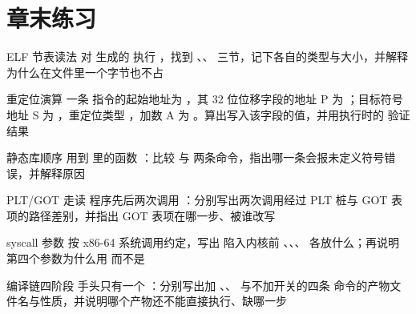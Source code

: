 \section*{章末练习}

\begin{chapterexercise}{ELF 节表读法}
对  生成的  执行 ，找到 、、 三节，记下各自的类型与大小，并解释  为什么在文件里一个字节也不占
\end{chapterexercise}

\begin{chapterexercise}{重定位演算}
一条  指令的起始地址为 ，其 32 位位移字段的地址 P 为 ；目标符号地址 S 为 ，重定位类型 ，加数 A 为 。算出写入该字段的值，并用执行时的  验证结果
\end{chapterexercise}

\begin{chapterexercise}{静态库顺序}
 用到  里的函数 ：比较  与  两条命令，指出哪一条会报未定义符号错误，并解释原因
\end{chapterexercise}

\begin{chapterexercise}{PLT/GOT 走读}
程序先后两次调用 ：分别写出两次调用经过 PLT 桩与 GOT 表项的路径差别，并指出 GOT 表项在哪一步、被谁改写
\end{chapterexercise}

\begin{chapterexercise}{syscall 参数}
按 x86-64 系统调用约定，写出  陷入内核前 、、、 各放什么；再说明第四个参数为什么用  而不是 
\end{chapterexercise}

\begin{chapterexercise}{编译链四阶段}
手头只有一个 ：分别写出加 、、 与不加开关的四条  命令的产物文件名与性质，并说明哪个产物还不能直接执行、缺哪一步
\end{chapterexercise}

